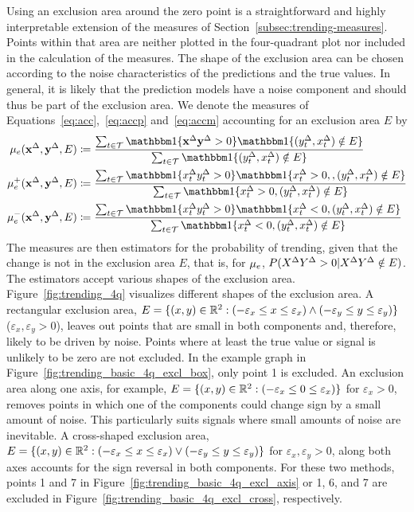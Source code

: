 Using an exclusion area around the zero point is a straightforward and highly interpretable extension of the measures of Section~\ref{subsec:trending-measures}.
Points within that area are neither plotted in the four-quadrant plot nor included in the calculation of the measures.
The shape of the exclusion area can be chosen according to the noise characteristics of the predictions and the true values.
In general, it is likely that the prediction models have a noise component and should thus be part of the exclusion area.
We denote the measures of Equations~\eqref{eq:acc},~\eqref{eq:accp} and~\eqref{eq:accm} accounting for an exclusion area $E$ by
\begin{align}
    \acceps (\diffx, \diffy, E) &\coloneqq \frac{\sum_{t \in \mathcal{T}} \ind{\diffx \diffy > 0} \ind{(\diffyt, \diffxt) \notin E}}{\sum_{t \in \mathcal{T}} \ind{(\diffyt, \diffxt) \notin E}}\label{eq:acceps}\\
    \accpeps (\diffx, \diffy, E) &\coloneqq \frac{\sum_{t \in \mathcal{T}} \ind{\diffxt \diffyt > 0} \ind{\diffxt > 0, , (\diffyt, \diffxt) \notin E}}{\sum_{t \in \mathcal{T}} \ind{\diffxt > 0, (\diffyt, \diffxt) \notin E}} \label{eq:accpeps}\\
    \accmeps (\diffx, \diffy, E) &\coloneqq \frac{\sum_{t \in \mathcal{T}} \ind{\diffxt \diffyt > 0} \ind{\diffxt < 0, (\diffyt, \diffxt) \notin E}}{\sum_{t \in \mathcal{T}} \ind{\diffxt < 0, (\diffyt, \diffxt) \notin E}}\label{eq:accmeps}
\end{align}
The measures are then estimators for the probability of trending, given that the change is not in the exclusion area $E$, that is, for $\mu_{e}$, $P(X^{\Delta} Y^{\Delta} > 0 | X^{\Delta} Y^{\Delta} \notin E)$.
The estimators accept various shapes of the exclusion area.
Figure~\ref{fig:trending_4q} visualizes different shapes of the exclusion area.
A rectangular exclusion area, $E = \{(x, y) \in \mathbb{R}^2: (-\varepsilon_x \leq x \leq \varepsilon_x) \land (-\varepsilon_y \leq y \leq \varepsilon_y) \}$ 
 ($\varepsilon_x, \varepsilon_y > 0$), leaves out points that are small in both components and, therefore, likely to be driven by noise.
Points where at least the true value or signal is unlikely to be zero are not excluded.
In the example graph in Figure~\ref{fig:trending_basic_4q_excl_box}, only point 1 is excluded.
An exclusion area along one axis, for example, $E = \{(x, y) \in \mathbb{R}^2: (-\varepsilon_x \leq 0 \leq \varepsilon_x)\}$ for $\varepsilon_x > 0$, removes points in which one of the components could change sign by a small amount of noise.
This particularly suits signals where small amounts of noise are inevitable.
A cross-shaped exclusion area, $E = \{(x, y) \in \mathbb{R}^2: (-\varepsilon_x \leq x \leq \varepsilon_x) \lor (-\varepsilon_y \leq y \leq \varepsilon_y) \}$ for $\varepsilon_x, \varepsilon_y > 0$, along both axes accounts for the sign reversal in both components.
For these two methods, points 1 and 7 in Figure~\ref{fig:trending_basic_4q_excl_axis} or 1, 6, and 7 are excluded in Figure~\ref{fig:trending_basic_4q_excl_cross}, respectively.


